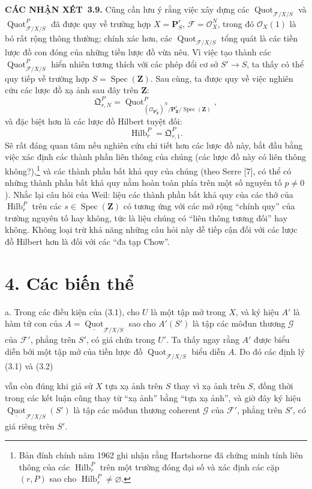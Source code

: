 \documentclass[11pt,twoside,openany]{book}
\numberwithin{equation}{section}
\newcommand{\src}[1]{%
  \phantomsection\hypertarget{src:\fgasourceid:#1}{}%
  \marginpar{\raggedleft\footnotesize\sffamily #1}%
}
\newcommand{\fgasourceid}{unset}
\newcommand{\fsection}[2]{%
  \section*{#1. #2}%
  \addcontentsline{toc}{section}{#1. #2}%
}
\newcommand{\result}[2]{\par\medskip\noindent\textbf{#1\if\relax\detokenize{#2}\relax\else\ #2\fi.}\quad}
\begin{document}
\result{CÁC NHẬN XÉT}{3.9} Cũng cần lưu ý rằng việc xây dựng các
$\operatorname{Quot}_{\mathcal F/X/S}$ và
$\operatorname{Quot}^P_{\mathcal F/X/S}$ đã được quy về trường hợp
$X=\mathbf P^r_S$, $\mathcal F=\mathcal O_X^N$, trong đó
$\mathcal O_X(1)$ là bó rất rộng thông thường; chính xác hơn, các
$\operatorname{Quot}_{\mathcal F/X/S}$ tổng quát là các tiền lược đồ con đóng
của những tiền lược đồ vừa nêu. Vì việc tạo thành các
$\operatorname{Quot}^P_{\mathcal F/X/S}$ hiển nhiên tương thích với các phép
đổi cơ sở $S'\longrightarrow S$, ta thấy có thể quy tiếp về trường hợp
$S=\operatorname{Spec}(\mathbf Z)$. Sau cùng, ta được quy về việc nghiên
cứu các lược đồ xạ ảnh sau đây trên $\mathbf Z$:
\[
\mathfrak Q^P_{r,N}=
\operatorname{Quot}^{P}_{(\mathcal O_{\mathbf P^r_{\mathbf Z}})^N/
\mathbf P^r_{\mathbf Z}/\operatorname{Spec}(\mathbf Z)},
\]
và đặc biệt hơn là các lược đồ Hilbert tuyệt đối:
\[
\operatorname{Hilb}^P_r=\mathfrak Q^P_{r,1}.
\]
Sẽ rất đáng quan tâm nếu nghiên cứu chi tiết hơn các lược đồ này, bắt đầu bằng
việc xác định các thành phần liên thông của chúng (các lược đồ này có liên
thông không?),\footnote{Bản đính chính năm 1962 ghi nhận rằng Hartshorne đã
chứng minh tính liên thông của các $\operatorname{Hilb}^P_r$ trên một trường
đóng đại số và xác định các cặp $(r,P)$ sao cho
$\operatorname{Hilb}^P_r\neq\varnothing$.} và các thành phần bất khả quy của
chúng (theo Serre [7], có thể có những thành phần bất khả quy nằm hoàn toàn
phía trên một số nguyên tố $p\neq0$). Nhắc lại câu hỏi của Weil: liệu các thành
phần bất khả quy của các thớ của $\operatorname{Hilb}^P_r$ trên các
$s\in\operatorname{Spec}(\mathbf Z)$ có tương ứng với các mở rộng
``chính quy'' của trường nguyên tố hay không, tức là liệu chúng có ``liên thông
tương đối'' hay không. Không loại trừ khả năng những câu hỏi này dễ tiếp cận
đối với các lược đồ Hilbert hơn là đối với các ``đa tạp Chow''.

\fsection{4}{Các biến thể}

\noindent a. Trong các điều kiện của (3.1), cho $U$ là một tập mở trong $X$,
và ký hiệu $A'$ là hàm tử con của
$A=\underline{\operatorname{Quot}}_{\mathcal F/X/S}$ sao cho $A'(S')$ là tập
các môđun thương $\mathcal G$ của $\mathcal F'$, phẳng trên $S'$, có giá chứa
trong $U'$. Ta thấy ngay rằng $A'$ được biểu diễn bởi một tập mở của tiền lược
đồ $\operatorname{Quot}_{\mathcal F/X/S}$ biểu diễn $A$. Do đó các định lý
(3.1) và (3.2)
\src{267}
vẫn còn đúng khi giả sử $X$ tựa xạ ảnh trên $S$ thay vì xạ ảnh trên $S$, đồng
thời trong các kết luận cũng thay từ ``xạ ảnh'' bằng ``tựa xạ ảnh'', và giờ
đây ký hiệu
$\underline{\operatorname{Quot}}_{\mathcal F/X/S}(S')$ là tập các môđun
thương coherent $\mathcal G$ của $\mathcal F'$, phẳng trên $S'$, có giá riêng
trên $S'$.
\end{document}
